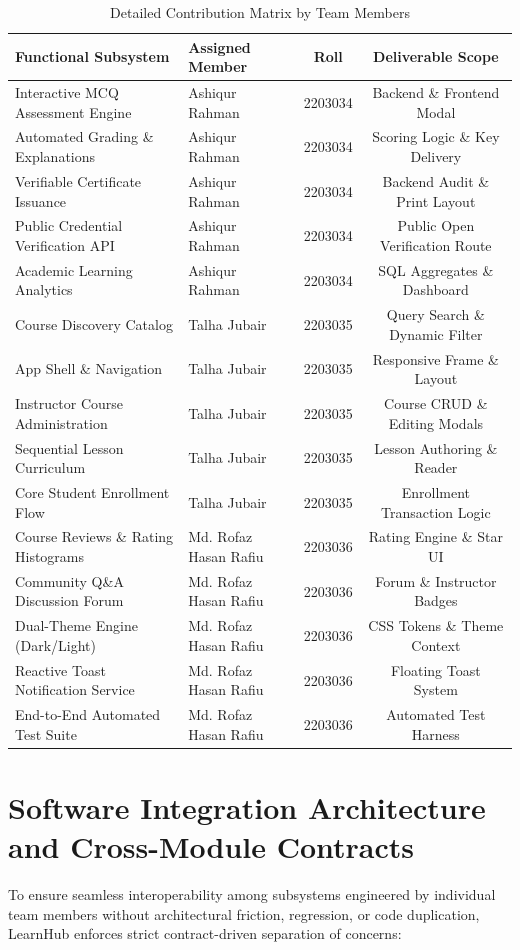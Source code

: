 \documentclass[12pt,a4paper]{report}
\begin{document}
\begin{table}[H]
\centering
\caption{Detailed Contribution Matrix by Team Members}
\label{tab:matrix}
\begin{tabularx}{\textwidth}{@{}lXcc@{}}
\toprule
\textbf{Functional Subsystem} & \textbf{Assigned Member} & \textbf{Roll} & \textbf{Deliverable Scope} \\ \midrule
Interactive MCQ Assessment Engine & Ashiqur Rahman & 2203034 & Backend \& Frontend Modal \\
Automated Grading \& Explanations & Ashiqur Rahman & 2203034 & Scoring Logic \& Key Delivery \\
Verifiable Certificate Issuance & Ashiqur Rahman & 2203034 & Backend Audit \& Print Layout \\
Public Credential Verification API & Ashiqur Rahman & 2203034 & Public Open Verification Route \\
Academic Learning Analytics & Ashiqur Rahman & 2203034 & SQL Aggregates \& Dashboard \\
Course Discovery Catalog & Talha Jubair & 2203035 & Query Search \& Dynamic Filter \\
App Shell \& Navigation & Talha Jubair & 2203035 & Responsive Frame \& Layout \\
Instructor Course Administration & Talha Jubair & 2203035 & Course CRUD \& Editing Modals \\
Sequential Lesson Curriculum & Talha Jubair & 2203035 & Lesson Authoring \& Reader \\
Core Student Enrollment Flow & Talha Jubair & 2203035 & Enrollment Transaction Logic \\
Course Reviews \& Rating Histograms & Md. Rofaz Hasan Rafiu & 2203036 & Rating Engine \& Star UI \\
Community Q\&A Discussion Forum & Md. Rofaz Hasan Rafiu & 2203036 & Forum \& Instructor Badges \\
Dual-Theme Engine (Dark/Light) & Md. Rofaz Hasan Rafiu & 2203036 & CSS Tokens \& Theme Context \\
Reactive Toast Notification Service & Md. Rofaz Hasan Rafiu & 2203036 & Floating Toast System \\
End-to-End Automated Test Suite & Md. Rofaz Hasan Rafiu & 2203036 & Automated Test Harness \\ \bottomrule
\end{tabularx}
\end{table}

\section{Software Integration Architecture and Cross-Module Contracts}
To ensure seamless interoperability among subsystems engineered by individual team members without architectural friction, regression, or code duplication, LearnHub enforces strict contract-driven separation of concerns:
\end{document}
